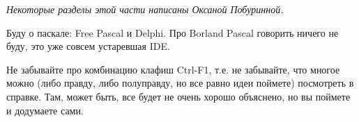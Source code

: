 

{\raggedleft\it
Некоторые разделы этой части написаны Оксаной Побуринной.
\par}





Буду о паскале: Free Pascal и Delphi. Про Borland Pascal говорить ничего не буду, это уже совсем 
устаревшая IDE.

Не забывайте про комбинацию клафиш Ctrl-F1, т.е. не забывайте, что многое можно (либо 
правду, либо полуправду, но все равно идеи поймете) посмотреть в справке. Там, может быть, все 
будет не очень хорошо объяснено, но вы поймете и додумаете сами.














